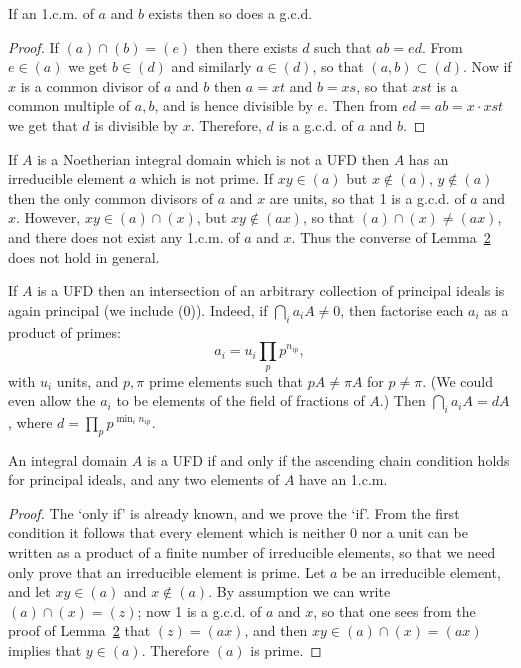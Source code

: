 \begin{lemma}\label{lem:20.2}
If an 1.c.m. of $a$ and $b$ exists then so does a g.c.d.
\end{lemma}

\begin{proof}
If $(a) \cap (b) = (e)$ then there exists $d$ such that $ab = ed$. From $e \in (a)$
we get $b \in (d)$ and similarly $a \in (d)$, so that $(a, b) \subset (d)$. Now if $x$ is a common
divisor of $a$ and $b$ then $a = xt$ and $b = xs$, so that $xst$ is a common multiple
of $a, b$, and is hence divisible by $e$. Then from $ed = ab = x \cdot xst$ we get that
$d$ is divisible by $x$. Therefore, $d$ is a g.c.d. of $a$ and $b$.
\end{proof}

\begin{remark}\label{rem:20.1}
If $A$ is a Noetherian integral domain which is not a UFD then
$A$ has an irreducible element $a$ which is not prime. If $xy \in (a)$ but $x \notin (a)$,
$y \notin (a)$ then the only common divisors of $a$ and $x$ are units, so that 1 is a
g.c.d. of $a$ and $x$. However, $xy \in (a) \cap (x)$, but $xy \notin (ax)$, so that $(a) \cap
(x) \neq (ax)$, and there does not exist any 1.c.m. of $a$ and $x$. Thus the converse
of Lemma~\hyperref[lem:20.2]{2} does not hold in general.
\end{remark}

\begin{remark}\label{rem:20.2}
If $A$ is a UFD then an intersection of an arbitrary collection
of principal ideals is again principal (we include (0)). Indeed, if $\bigcap_i a_iA \neq 0$,
then factorise each $a_i$ as a product of primes:
\[
  a_i = u_i \prod_p p^{n_{ip}},
\]
with $u_i$ units, and $p, \pi$ prime elements such that $pA \neq \pi A$ for $p \neq \pi$.
(We could even allow the $a_i$ to be elements of the field of fractions of $A$.)
Then $\bigcap_i a_iA = dA$, where $d = \prod_p p^{\min_i n_{ip}}$.
\end{remark}

\begin{theorem}\label{thm:20.5}
An integral domain $A$ is a UFD if and only if the ascending
chain condition holds for principal ideals, and any two elements of $A$ have
an 1.c.m.
\end{theorem}

\begin{proof}
The `only if' is already known, and we prove the `if'. From the first
condition it follows that every element which is neither 0 nor a unit can
be written as a product of a finite number of irreducible elements, so that
we need only prove that an irreducible element is prime. Let $a$ be an
irreducible element, and let $xy \in (a)$ and $x \notin (a)$. By assumption we can
write $(a) \cap (x) = (z)$; now 1 is a g.c.d. of $a$ and $x$, so that one sees from the
proof of Lemma~\hyperref[lem:20.2]{2} that $(z) = (ax)$, and then $xy \in (a) \cap (x) = (ax)$ implies
that $y \in (a)$. Therefore $(a)$ is prime.
\end{proof}

